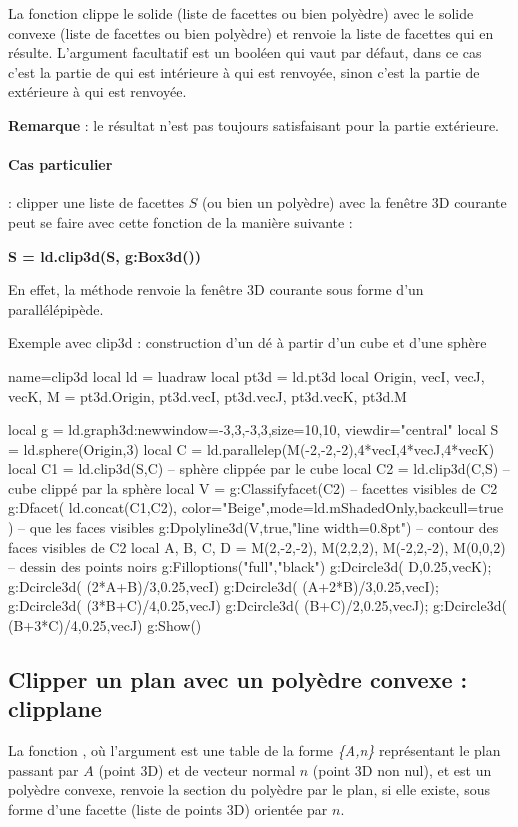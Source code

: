 La fonction  clippe le solide  (liste de facettes ou bien polyèdre) avec le solide convexe  (liste de facettes ou bien polyèdre) et renvoie la liste de facettes qui en résulte. L'argument facultatif  est un booléen qui vaut \false par défaut, dans ce cas c'est la partie de  qui est intérieure à  qui est renvoyée, sinon c'est la partie de  extérieure à  qui est renvoyée.

\textbf{Remarque} : le résultat n'est pas toujours satisfaisant pour la partie extérieure.

\paragraph{Cas particulier} : clipper une liste de facettes $S$ (ou bien un polyèdre) avec la fenêtre 3D courante peut se faire avec cette fonction de la manière suivante :

\begin{center}
\textbf{S = ld.clip3d(S, g:Box3d())}
\end{center}

En effet, la méthode  renvoie la fenêtre 3D courante sous forme d'un parallélépipède.

\begin{demo}[clip3d]{Exemple avec clip3d : construction d'un dé à partir d'un cube et d'une sphère}
\begin{luadraw}{name=clip3d}
local ld = luadraw
local pt3d = ld.pt3d
local Origin, vecI, vecJ, vecK, M = pt3d.Origin, pt3d.vecI, pt3d.vecJ, pt3d.vecK, pt3d.M

local g = ld.graph3d:new{window={-3,3,-3,3},size={10,10}, viewdir="central"}
local S = ld.sphere(Origin,3)
local C = ld.parallelep(M(-2,-2,-2),4*vecI,4*vecJ,4*vecK)
local C1 = ld.clip3d(S,C) -- sphère clippée par le cube
local C2 = ld.clip3d(C,S) -- cube clippé par la sphère
local V = g:Classifyfacet(C2) -- facettes visibles de C2
g:Dfacet( ld.concat(C1,C2), {color="Beige",mode=ld.mShadedOnly,backcull=true} ) -- que les faces visibles
g:Dpolyline3d(V,true,"line width=0.8pt") -- contour des faces visibles de C2
local A, B, C, D = M(2,-2,-2), M(2,2,2), M(-2,2,-2), M(0,0,2) -- dessin des points noirs
g:Filloptions("full","black")
g:Dcircle3d( D,0.25,vecK); g:Dcircle3d( (2*A+B)/3,0.25,vecI)
g:Dcircle3d( (A+2*B)/3,0.25,vecI); g:Dcircle3d( (3*B+C)/4,0.25,vecJ)
g:Dcircle3d( (B+C)/2,0.25,vecJ); g:Dcircle3d( (B+3*C)/4,0.25,vecJ)
g:Show()
\end{luadraw}
\end{demo}

\subsection{Clipper un plan avec un polyèdre convexe : clipplane}

La fonction , où l'argument  est une table de la forme \emph{\{A,n\}} représentant le plan passant par $A$ (point 3D) et de vecteur normal $n$ (point 3D non nul), et  est un polyèdre convexe, renvoie la section du polyèdre par le plan, si elle existe, sous forme d'une facette (liste de points 3D) orientée par $n$.
